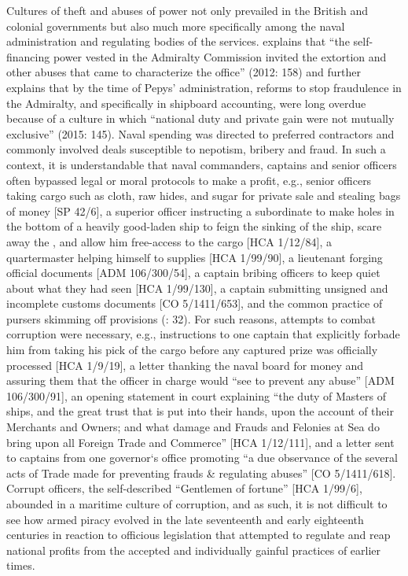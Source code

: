 Cultures of theft and abuses of power not only prevailed in the British and colonial governments but also much more specifically among the naval administration and regulating bodies of the  services. \citeauthor{Bicheno2012} explains that “the self-financing power vested in the Admiralty Commission invited the extortion and other abuses that came to characterize the office” (2012: 158) and \citeauthor{Lincoln2015} further explains that by the time of Pepys’ administration, reforms to stop fraudulence in the Admiralty, and specifically in shipboard accounting, were long overdue because of a culture in which “national duty and private gain were not mutually exclusive” (2015: 145). Naval spending was directed to preferred contractors and commonly involved deals susceptible to nepotism, bribery and fraud. In such a context, it is understandable that naval commanders, captains and senior officers often bypassed legal or moral protocols to make a profit, e.g., senior officers taking cargo such as cloth, raw hides, and sugar for private sale and stealing bags of money [SP 42/6], a superior officer instructing a subordinate to make holes in the bottom of a heavily good-laden ship to feign the sinking of the ship, scare away the , and allow him free-access to the cargo [HCA 1/12/84], a quartermaster helping himself to  supplies [HCA 1/99/90], a lieutenant forging official documents [ADM 106/300/54], a captain bribing officers to keep quiet about what they had seen [HCA 1/99/130], a captain submitting unsigned and incomplete customs documents [CO 5/1411/653], and the common practice of pursers skimming off provisions (\citealt{AdkinsAdkins2008}: 32).  For such reasons, attempts to combat corruption were necessary, e.g., instructions to one captain that explicitly forbade him from taking his pick of the cargo before any captured prize was officially processed [HCA 1/9/19], a letter thanking the naval board for money and assuring them that the officer in charge would “see to prevent any abuse” [ADM 106/300/91], an opening statement in court explaining “the duty of Masters of ships, and the great trust that is put into their hands, upon the account of their Merchants and Owners; and what damage and Frauds and Felonies at Sea do bring upon all Foreign Trade and Commerce” [HCA 1/12/111], and a letter sent to captains from one governor‘s office promoting “a due observance of the several acts of Trade made for preventing frauds \& regulating abuses” [CO 5/1411/618]. Corrupt officers, the self-described “Gentlemen of fortune” [HCA 1/99/6], abounded in a maritime culture of corruption, and as such, it is not difficult to see how armed piracy evolved in the late seventeenth and early eighteenth centuries in reaction to officious legislation that attempted to regulate and reap national profits from the accepted and individually gainful practices of earlier times. 

